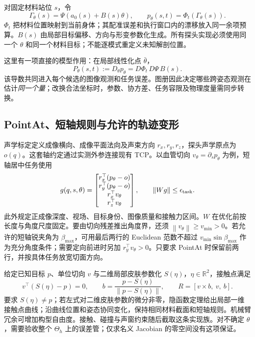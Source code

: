 \documentclass[UTF8,fontset=fandol,zihao=5,a4paper]{ctexart}
\newcommand{\R}{\mathbb R}\newcommand{\N}{\mathcal N}
\newcommand{\norm}[1]{\left\lVert#1\right\rVert}
\theoremstyle{definition}
\theoremstyle{remark}\newtheorem{remark}[theorem]{说明}
\numberwithin{equation}{section}
\begin{document}
对固定材料站位 $s$，令
\begin{equation}
\Gamma_\theta(s)=\Psi\!\left(a_0(s)+B(s)\theta\right),\qquad
p_\theta(s,t)=\Phi_t\!\left(\Gamma_\theta(s)\right).
\label{eq:materialtarget73}
\end{equation}
$\Phi_t$ 把材料位置映射到当前身体；其配准误差和执行窗口内的漂移放入同一余项预算。$B(s)$ 由局部目标偏移、方向与形变参数化生成。所有探头实现必须使用同一个 $\theta$ 和同一个材料目标；不能逐模式重定义未知解剖位置。

这里有一项直接的模型作用：在局部线性化点 $\bar\theta$，
\begin{equation}
P_\theta(s,t):=D_\theta p_\theta
=D\Phi_t\,D\Psi\,B(s).
\label{eq:materialderivative73}
\end{equation}
该导数共同进入每个候选的图像观测和任务误差。图册因此决定哪些跨姿态观测在估计\emph{同一个量}；改换合法坐标时，参数、协方差、任务容限及物理度量需同步转换。

\subsection{PointAt、短轴规则与允许的轨迹变形}
声学标定定义成像横向、成像平面法向及声束方向 $r_x,r_y,r_z$，探头声学原点为 $o(q)$。这套轴约定通过实测外参连接现有 TCP。以血管切向 $v_\theta=\partial_s p_\theta$ 为例，短轴居中任务使用
\begin{equation}
g(q,s,\theta)=
\begin{bmatrix}
r_x^\top(p_\theta-o)\\r_y^\top(p_\theta-o)\\
r_x^\top v_\theta\\r_z^\top v_\theta
\end{bmatrix},
\qquad\norm{Wg}\le\epsilon_{\rm task}.
\label{eq:taskrule73}
\end{equation}
此外规定正成像深度、视场、目标身份、图像质量和接触力区间。$W$ 在优化前按长度与角度尺度固定。要由切向残差推出角度界，还须 $\norm{v_\theta}\ge v_{\min}>0$。若允许的短轴锐夹角为 $\beta_{\max}$，可用最后两行的 Euclidean 范数不超过 $v_{\min}\sin\beta_{\max}$ 作为充分角度条件；需要定向前进时另加 $r_y^\top v_\theta>0$。只要求 PointAt 时保留前两行，并按具体任务放宽切面方向。

给定已知目标 $p$、单位切向 $v$ 与二维局部皮肤参数化 $S(\eta)$，$\eta\in\R^2$，接触点满足
\begin{equation}
v^\top(S(\eta)-p)=0,\qquad b=\frac{p-S(\eta)}{\norm{p-S(\eta)}},\qquad
R=[v\times b,\ v,\ b].
\label{eq:taskfiber73}
\end{equation}
要求 $S(\eta)\ne p$；若左式对二维皮肤参数的微分非零，隐函数定理给出局部一维接触点曲线；沿曲线位置和姿态协同变化，保持相同材料截面和短轴规则。机械臂冗余可增加构型自由度。接触、碰撞与声窗约束随后截取这条实现族。对不确定 $\theta$，需要验收整个 $\Theta_h$ 上的误差管；仅求名义 Jacobian 的零空间没有这项保证。
\end{document}
